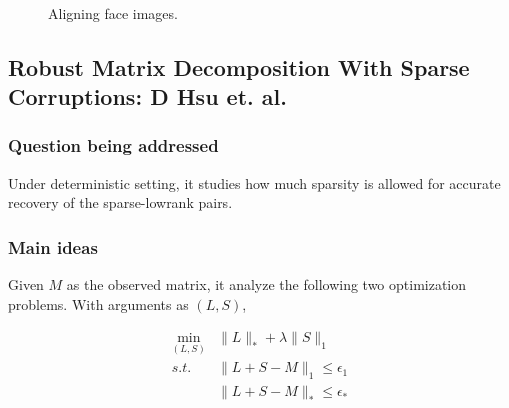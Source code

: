 \begin{figure}[h!]
  ~

  \caption{Aligning face images.}
  \label{fig:rasl:example}
\end{figure}



\subsection{Robust Matrix Decomposition With Sparse Corruptions: D Hsu et. al.}

\subsubsection{Question being addressed}

Under deterministic setting, it studies how much sparsity is allowed for accurate recovery of the sparse-lowrank pairs.


\subsubsection{Main ideas}

Given $M$ as the observed matrix, it analyze the following two optimization problems. With arguments as $(L,S)$,

\begin{eqnarray}
\min_{(L,S)} & \|L\|_{*}+\lambda\|S\|_{1}\nonumber \\
s.t. & \|L+S-M\|_{1}\le\epsilon_{1}\\
 & \|L+S-M\|_{*}\le\epsilon_{*}\nonumber
\end{eqnarray}


